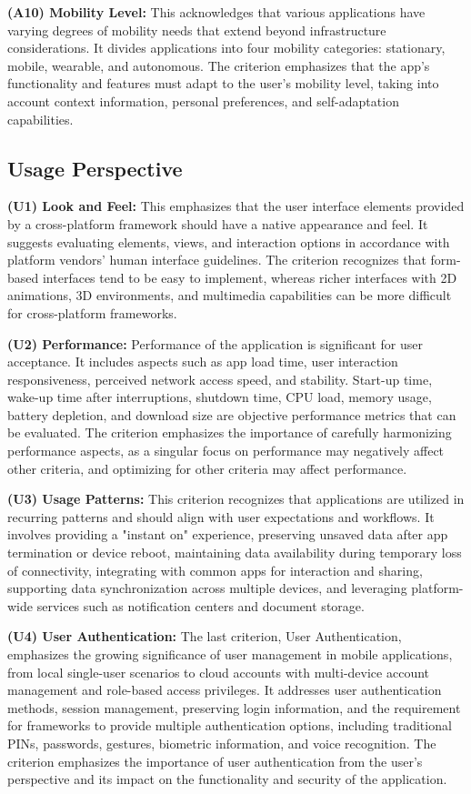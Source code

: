 \textbf{(A10) Mobility Level:}
This acknowledges that various applications have varying degrees of mobility needs that extend beyond infrastructure considerations. It divides applications into four mobility categories: stationary, mobile, wearable, and autonomous. The criterion emphasizes that the app's functionality and features must adapt to the user's mobility level, taking into account context information, personal preferences, and self-adaptation capabilities.

\subsection{Usage Perspective}
\textbf{(U1) Look and Feel:}
This emphasizes that the user interface elements provided by a cross-platform framework should have a native appearance and feel. It suggests evaluating elements, views, and interaction options in accordance with platform vendors' human interface guidelines. The criterion recognizes that form-based interfaces tend to be easy to implement, whereas richer interfaces with 2D animations, 3D environments, and multimedia capabilities can be more difficult for cross-platform frameworks.

\textbf{(U2) Performance:}
Performance of the application is significant for user acceptance. It includes aspects such as app load time, user interaction responsiveness, perceived network access speed, and stability. Start-up time, wake-up time after interruptions, shutdown time, CPU load, memory usage, battery depletion, and download size are objective performance metrics that can be evaluated. The criterion emphasizes the importance of carefully harmonizing performance aspects, as a singular focus on performance may negatively affect other criteria, and optimizing for other criteria may affect performance.

\textbf{(U3) Usage Patterns:}
This criterion recognizes that applications are utilized in recurring patterns and should align with user expectations and workflows. It involves providing a "instant on" experience, preserving unsaved data after app termination or device reboot, maintaining data availability during temporary loss of connectivity, integrating with common apps for interaction and sharing, supporting data synchronization across multiple devices, and leveraging platform-wide services such as notification centers and document storage.

\textbf{(U4) User Authentication:}
The last criterion, User Authentication, emphasizes the growing significance of user management in mobile applications, from local single-user scenarios to cloud accounts with multi-device account management and role-based access privileges. It addresses user authentication methods, session management, preserving login information, and the requirement for frameworks to provide multiple authentication options, including traditional PINs, passwords, gestures, biometric information, and voice recognition. The criterion emphasizes the importance of user authentication from the user's perspective and its impact on the functionality and security of the application.